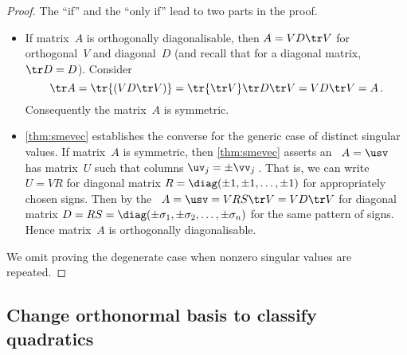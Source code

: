 \begin{proof} 
The ``if'' and the ``only if'' lead to two parts in the proof.
\begin{itemize}
\item If matrix~\(A\) is orthogonally diagonalisable, then \(A=VD\tr V\) for orthogonal~\(V\) and diagonal~\(D\) (and recall that for a diagonal matrix, \(\tr D=D\)).
Consider
\begin{equation*}
\tr A=\tr{(VD\tr V)}
=\tr{{\tr V}}\tr D\tr V
=VD\tr V=A\,.
\end{equation*}
Consequently the matrix~\(A\) is symmetric.

\item \autoref{thm:smevec} establishes the converse for the generic case of distinct singular values.
If matrix~\(A\) is symmetric, then \autoref{thm:smevec} asserts an \svd\ \(A=\usv\) has matrix~\(U\) such that columns \(\uv_j=\pm\vv_j\)\,.
That is, we can write \(U=VR\) for diagonal matrix \(R=\diag(\pm1,\pm1,\ldots,\pm1)\) for appropriately chosen signs.
Then by the \svd\ \(A=\usv=VRS\tr V=VD\tr V\) for diagonal matrix \(D=RS=\diag(\pm\sigma_1,\pm\sigma_2,\ldots,\pm\sigma_n)\) for the same pattern of signs.
Hence matrix~\(A\) is orthogonally diagonalisable.
\end{itemize}
We omit proving the degenerate case when nonzero singular values are repeated.
\end{proof}

\begin{comment}
Further material could include the following---maybe exercises.
For every \idx{symmetric matrix}, \(A^k=VD^k\tr V\).
Also, every \idx{square matrix} has a \idx{polar decomposition} \(A=RQ\) for symmetric positive semi-definite~\(R\) and orthogonal~\(Q\) (since \(A=\usv=(US\tr U)(U\tr V)\)) \pooliv{p.610}.  
\cite{Higham86} mentions applications to the Orthogonal Procrustes problem (perhaps in approx matrices), Aerospace, Optimisation, Matrix square root, but these look too hard for this level.
\end{comment}









\subsection{Change orthonormal basis to classify quadratics}
\label{sec:cobcqs}

